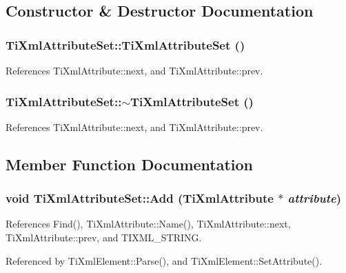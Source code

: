 \subsection{Constructor \& Destructor Documentation}
\subsubsection[TiXmlAttributeSet]{\setlength{\rightskip}{0pt plus 5cm}TiXmlAttributeSet::TiXmlAttributeSet ()}\label{classTiXmlAttributeSet_253c33b657cc85a07f7f060b02146c35}




References TiXmlAttribute::next, and TiXmlAttribute::prev.
\subsubsection[$\sim$TiXmlAttributeSet]{\setlength{\rightskip}{0pt plus 5cm}TiXmlAttributeSet::$\sim$TiXmlAttributeSet ()}\label{classTiXmlAttributeSet_dd463905dff96142a29fe16a01ecf28f}




References TiXmlAttribute::next, and TiXmlAttribute::prev.

\subsection{Member Function Documentation}
\subsubsection[Add]{\setlength{\rightskip}{0pt plus 5cm}void TiXmlAttributeSet::Add ({\bf TiXmlAttribute} $\ast$ {\em attribute})}\label{classTiXmlAttributeSet_745e50ddaae3bee93e4589321e0b9c1a}




References Find(), TiXmlAttribute::Name(), TiXmlAttribute::next, TiXmlAttribute::prev, and TIXML\_\-STRING.

Referenced by TiXmlElement::Parse(), and TiXmlElement::SetAttribute().
